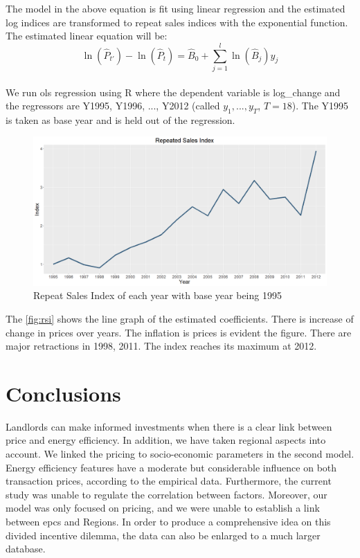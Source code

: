 \documentclass[12pt]{article}
\begin{document}
The model in the above equation is fit using linear regression and the estimated log indices are transformed to repeat sales indices with the exponential function. The estimated linear equation will be:
$$\ln (\hat P_{t'})-\ln(\hat P_t)=\hat B_{0}+\sum_{j=1} ^{l} \ln (\hat B_j) y_{j}$$
\\
We run \acrshort{ols} regression using R where the dependent variable is log\_change and the regressors are Y1995, Y1996, ..., Y2012 (called $y_1, ..., y_T$, $T=18$). The Y1995 is taken as base year and is held out of the regression.
 
\begin{figure}[H]
    \centering
    \includegraphics[width=18cm]{5. RSI images/rsiplot.png}
    \caption{Repeat Sales Index of each year with base year being 1995}
    \label{fig:rsi}
\end{figure}

The \autoref{fig:rsi} shows the line graph of the estimated coefficients. There is increase of change in prices over years. The inflation is prices is evident the figure. There are major retractions in 1998, 2011. The index reaches its maximum at 2012.

\section{Conclusions}
\label{sec:conc}
Landlords can make informed investments when there is a clear link between price and energy efficiency. In addition, we have taken regional aspects into account. We linked the pricing to socio-economic parameters in the second model. Energy efficiency features have a moderate but considerable influence on both transaction prices, according to the empirical data. Furthermore, the current study was unable to regulate the correlation between factors. Moreover, our model was only focused on pricing, and we were unable to establish a link between \acrshort{epc}s and Regions. In order to produce a comprehensive idea on this divided incentive dilemma, the data can also be enlarged to a much larger database.
\end{document}
